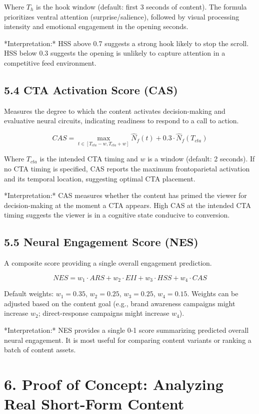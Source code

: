 \documentclass[11pt,letterpaper]{article}
\begin{document}
Where $T_h$ is the hook window (default: first 3 seconds of content). The formula prioritizes ventral attention (surprise/salience), followed by visual processing intensity and emotional engagement in the opening seconds.

*Interpretation:* HSS above 0.7 suggests a strong hook likely to stop the scroll. HSS below 0.3 suggests the opening is unlikely to capture attention in a competitive feed environment.

\subsection{5.4 CTA Activation Score (CAS)}

Measures the degree to which the content activates decision-making and evaluative neural circuits, indicating readiness to respond to a call to action.

$$CAS = \max_{t \in [T_{cta}-w, T_{cta}+w]} \hat{N}_f(t) + 0.3 \cdot \hat{N}_f(T_{cta})$$

Where $T_{cta}$ is the intended CTA timing and $w$ is a window (default: 2 seconds). If no CTA timing is specified, CAS reports the maximum frontoparietal activation and its temporal location, suggesting optimal CTA placement.

*Interpretation:* CAS measures whether the content has primed the viewer for decision-making at the moment a CTA appears. High CAS at the intended CTA timing suggests the viewer is in a cognitive state conducive to conversion.

\subsection{5.5 Neural Engagement Score (NES)}

A composite score providing a single overall engagement prediction.

$$NES = w_1 \cdot ARS + w_2 \cdot EII + w_3 \cdot HSS + w_4 \cdot CAS$$

Default weights: $w_1 = 0.35$, $w_2 = 0.25$, $w_3 = 0.25$, $w_4 = 0.15$. Weights can be adjusted based on the content goal (e.g., brand awareness campaigns might increase $w_2$; direct-response campaigns might increase $w_4$).

*Interpretation:* NES provides a single 0-1 score summarizing predicted overall neural engagement. It is most useful for comparing content variants or ranking a batch of content assets.


\section{6. Proof of Concept: Analyzing Real Short-Form Content}
\end{document}
